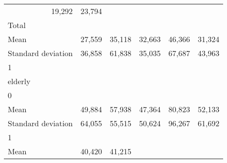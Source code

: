 \begin{tabular}{llllll}
  \multicolumn{1}{r}{19,292} &
  \multicolumn{1}{r}{23,794} \\
\multicolumn{1}{l}{\hspace{3em}Total} &
  \multicolumn{1}{|r}{} &
  \multicolumn{1}{r}{} &
  \multicolumn{1}{r}{} &
  \multicolumn{1}{r}{} &
  \multicolumn{1}{r}{} \\
\multicolumn{1}{l}{\hspace{4em}Mean} &
  \multicolumn{1}{|r}{27,559} &
  \multicolumn{1}{r}{35,118} &
  \multicolumn{1}{r}{32,663} &
  \multicolumn{1}{r}{46,366} &
  \multicolumn{1}{r}{31,324} \\
\multicolumn{1}{l}{\hspace{4em}Standard deviation} &
  \multicolumn{1}{|r}{36,858} &
  \multicolumn{1}{r}{61,838} &
  \multicolumn{1}{r}{35,035} &
  \multicolumn{1}{r}{67,687} &
  \multicolumn{1}{r}{43,963} \\
\multicolumn{1}{l}{\hspace{1em}1} &
  \multicolumn{1}{|r}{} &
  \multicolumn{1}{r}{} &
  \multicolumn{1}{r}{} &
  \multicolumn{1}{r}{} &
  \multicolumn{1}{r}{} \\
\multicolumn{1}{l}{\hspace{2em}elderly} &
  \multicolumn{1}{|r}{} &
  \multicolumn{1}{r}{} &
  \multicolumn{1}{r}{} &
  \multicolumn{1}{r}{} &
  \multicolumn{1}{r}{} \\
\multicolumn{1}{l}{\hspace{3em}0} &
  \multicolumn{1}{|r}{} &
  \multicolumn{1}{r}{} &
  \multicolumn{1}{r}{} &
  \multicolumn{1}{r}{} &
  \multicolumn{1}{r}{} \\
\multicolumn{1}{l}{\hspace{4em}Mean} &
  \multicolumn{1}{|r}{49,884} &
  \multicolumn{1}{r}{57,938} &
  \multicolumn{1}{r}{47,364} &
  \multicolumn{1}{r}{80,823} &
  \multicolumn{1}{r}{52,133} \\
\multicolumn{1}{l}{\hspace{4em}Standard deviation} &
  \multicolumn{1}{|r}{64,055} &
  \multicolumn{1}{r}{55,515} &
  \multicolumn{1}{r}{50,624} &
  \multicolumn{1}{r}{96,267} &
  \multicolumn{1}{r}{61,692} \\
\multicolumn{1}{l}{\hspace{3em}1} &
  \multicolumn{1}{|r}{} &
  \multicolumn{1}{r}{} &
  \multicolumn{1}{r}{} &
  \multicolumn{1}{r}{} &
  \multicolumn{1}{r}{} \\
\multicolumn{1}{l}{\hspace{4em}Mean} &
  \multicolumn{1}{|r}{40,420} &
  \multicolumn{1}{r}{41,215} &

\end{tabular}
